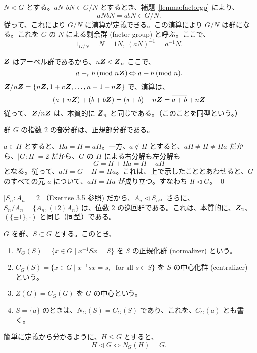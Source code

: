 \medskip
$N\lhd G$ とする。$aN, bN\in G/N$ とするとき、補題~\ref{lemma:factorgp} により、
$$aNbN = abN \in G/N.$$
従って、これにより $G/N$ に演算が定義できる。この演算により $G/N$ は群になる。これを $G$ の $N$ による剰余群 (factor group) と呼ぶ。ここで、
$$1_{G/N} = N = 1N,\;(aN)^{-1} = a^{-1}N.$$

\begin{eg}
$\mbox{\boldmath $Z$}$ はアーベル群であるから、$n\mbox{\boldmath $Z$} \lhd \mbox{\boldmath $Z$}$。ここで、
$$a \equiv_r b\;(\mbox{{\rm mod}}\; n\mbox{\boldmath $Z$}) \Leftrightarrow a\equiv b\;(\mbox{{\rm mod}}\; n).$$
$\mbox{\boldmath $Z$}/n\mbox{\boldmath $Z$} = \{n\mbox{\boldmath $Z$}, 1 + n\mbox{\boldmath $Z$}, \ldots, n-1+n\mbox{\boldmath $Z$}\}$  で、演算は、
$$(a + n\mbox{\boldmath $Z$}) + (b + b\mbox{\boldmath $Z$}) = (a+b)+n\mbox{\boldmath $Z$}  = \overline{a+b} + n\mbox{\boldmath $Z$}$$
従って、$\mbox{\boldmath $Z$}/n\mbox{\boldmath $Z$}$ は、本質的に $\mbox{\boldmath $Z$}_n$ と同じである。（このことを同型という。）
\end{eg}

\begin{lemma} \label{lemma:index2}
群 $G$ の指数 $2$ の部分群は、正規部分群である。
\end{lemma}
\proof
$a\in H$ とすると、$Ha = H = aH$。一方、$a\not\in H$ とすると、$aH \neq H \neq Ha$ だから、$|G:H| = 2$ だから、$G$ の $H$ による右分解も左分解も
$$G = H + Ha = H + aH$$
となる。従って、$aH = G - H = Ha$。これは、上で示したこととあわせると、$G$ のすべての元 $a$ について、$aH = Ha$ が成り立つ。すなわち $H\lhd G$。
\qed

\begin{eg} \label{eg:ansn}
$|S_n:A_n| = 2$ （Exercise 3.5 参照) だから、$A_n\lhd S_n$。さらに、
$S_n/A_n = \{A_n, (12)A_n\}$ は、位数 $2$ の巡回群である。これは、本質的に、$\mbox{\boldmath $Z$}_2$、$(\{\pm 1\},\cdot)$  と同じ（同型）である。
\end{eg}

\begin{definition}
$G$  を群、$S\subset G$ とする。このとき、
\begin{enumerate}
\item $N_G(S) = \{x\in G\mid x^{-1}Sx = S\}$ を $S$ の正規化群 (normalizer) という。
\item $C_G(S) = \{x\in G\mid x^{-1}sx = s, \;\mbox{ for all }s\in S\}$ を $S$ の中心化群 (centralizer) という。
\item $Z(G) = C_G(G)$ を $G$ の中心という。
\item $S = \{a\}$ のときは、$N_G(S) = C_G(S)$ であり、これを、$C_G(a)$ とも書く。
\end{enumerate}
\end{definition}

簡単に定義から分かるように、$H\leq G$ とすると、
$$H\lhd G \Leftrightarrow N_G(H) = G.$$

